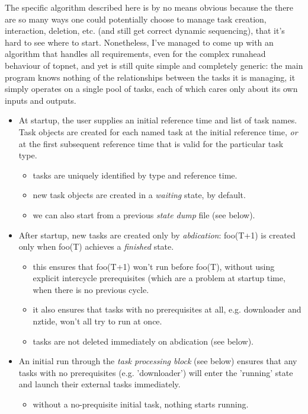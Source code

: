 \documentclass[12pt]{article}
\begin{document}
The specific algorithm described here is by no means obvious because the
there are so many ways one could potentially choose to manage task
creation, interaction, deletion, etc. (and still get correct dynamic
sequencing), that it's hard to see where to start. Nonetheless, I've
managed to come up with an algorithm that handles all requirements, even
for the complex runahead behaviour of topnet, and yet is still quite
simple and completely generic: the main program knows nothing of the
relationships between the tasks it is managing, it simply operates on a
single pool of tasks, each of which cares only about its own inputs and
outputs.  

\begin{itemize}
    \item At startup, the user supplies an initial reference time and
    list of task names. Task objects are created for each named task at
    the initial reference time, {\em or} at the first subsequent
    reference time that is valid for the particular task type.
    \begin{itemize}
        \item tasks are uniquely identified by type and reference time. 
        \item new task objects are created in a {\em waiting} state, by
        default.
        \item we can also start from a previous {\em state dump} file
        (see below).
    \end{itemize}

\item After startup, new tasks are created only by {\em abdication}:
foo(T+1) is created only when foo(T) achieves a {\em finished} state.
    \begin{itemize}
    \item this ensures that foo(T+1) won't run before foo(T), without
    using explicit intercycle prerequisites (which are a problem at
    startup time, when there is no previous cycle. 
    \item it also ensures that tasks with no prerequisites at all, e.g.
    downloader and nztide, won't all try to run at once.
    \item tasks are not deleted immediately on abdication (see below). 
    \end{itemize}

\item An initial run through the {\em task processing block} (see below)
ensures that any tasks with no prerequisites (e.g. 'downloader') will
enter the 'running' state and launch their external tasks immediately.
    \begin{itemize}
    \item without a no-prequisite initial task, nothing starts running.
    \end{itemize}


\end{itemize}
\end{document}
